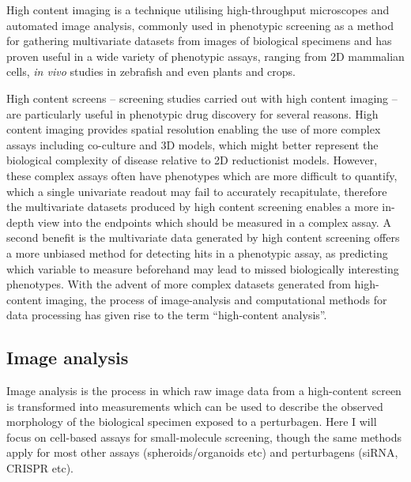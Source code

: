 \documentclass[a4paper,11pt,twoside,openright]{scrbook}
\begin{document}
High content imaging is a technique utilising high-throughput microscopes and automated image analysis, commonly used 
in phenotypic screening as a method for gathering multivariate datasets from images of biological specimens and has 
proven useful in a wide variety of phenotypic assays, ranging from 2D mammalian cells, \cite{Leggett2016,Tabata2015} 
\textit{in vivo} studies in zebrafish \cite{GeoffreyBurns2005} and even plants and crops. \cite{Chen2014}

High content screens -- screening studies carried out with high content imaging -- are particularly useful in 
phenotypic drug discovery for several reasons.
High content imaging provides spatial resolution enabling the use of more complex assays including co-culture and 3D 
models, which might better represent the biological complexity of disease relative to 2D reductionist models.
However, these complex assays often have phenotypes which are more difficult to quantify, which a single univariate 
readout may fail to accurately recapitulate,
therefore the multivariate datasets produced by high content screening enables a more in-depth view into the endpoints 
which should be measured in a complex assay.
A second benefit is the multivariate data generated by high content screening offers a more unbiased method for 
detecting hits in a phenotypic assay, as predicting which variable to measure beforehand may lead to missed 
biologically interesting phenotypes.
With the advent of more complex datasets generated from high-content imaging, the process of image-analysis and 
computational methods for data processing has given rise to the term ``high-content analysis''.


\subsection{Image analysis}

Image analysis is the process in which raw image data from a high-content screen is transformed into measurements which 
can be used to describe the observed morphology of the biological specimen exposed to a perturbagen.
Here I will focus on cell-based assays for small-molecule screening, though the same methods apply for most other 
assays (spheroids/organoids etc) and perturbagens (siRNA, CRISPR etc).
\end{document}
